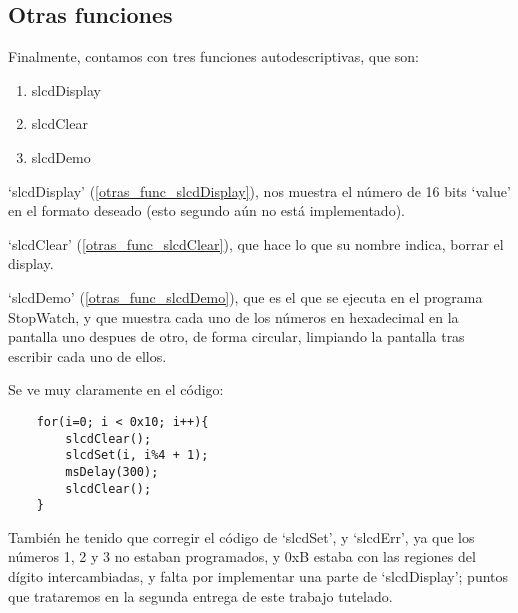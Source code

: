 \documentclass[a4paper,openright,12pt]{article}
\begin{document}
\subsection{Otras funciones}
Finalmente, contamos con tres funciones autodescriptivas, que son:
\begin{enumerate}[a]
    \item slcdDisplay   \label{otras_func_slcdDisplay}
    \item slcdClear     \label{otras_func_slcdClear}
    \item slcdDemo      \label{otras_func_slcdDemo}
\end{enumerate}


`slcdDisplay' (\ref{otras_func_slcdDisplay}), nos muestra el número de 16 bits `value' en el formato deseado (esto segundo aún no está implementado).

`slcdClear' (\ref{otras_func_slcdClear}), que hace lo que su nombre indica, borrar el display.

`slcdDemo' (\ref{otras_func_slcdDemo}), que es el que se ejecuta en el programa StopWatch, y que muestra cada uno de los números en hexadecimal en la pantalla uno
despues de otro, de forma circular, limpiando la pantalla tras escribir cada uno de ellos.

Se ve muy claramente en el código:
\begin{verbatim}
    for(i=0; i < 0x10; i++){
        slcdClear();
        slcdSet(i, i%4 + 1);
        msDelay(300);
        slcdClear();
    }   
\end{verbatim}

También he tenido que corregir el código de `slcdSet', y `slcdErr', ya que los números 1, 2 y 3 no estaban programados,
y 0xB estaba con las regiones del dígito intercambiadas, y falta por implementar una parte de `slcdDisplay'; puntos que trataremos en la
segunda entrega de este trabajo tutelado.


\printbibliography[]{}
\end{document}
